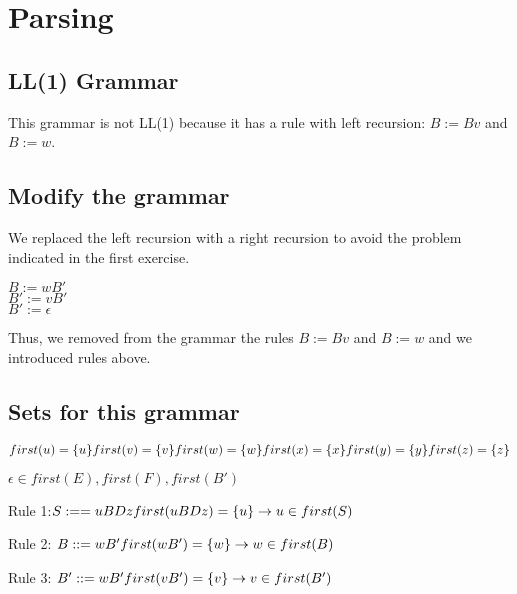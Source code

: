 \label{parsing}
\section{Parsing}
\subsection{LL(1) Grammar}
 This grammar is not LL(1) because it has a rule with left recursion: $B:=Bv$ and $B:=w$.\\
\subsection{Modify the grammar}
We replaced the left recursion with a right recursion to avoid the problem indicated in the first exercise.
\begin{center}            
	$B:=wB'$\\
        $B':=vB'$\\
        $B':=\epsilon$\\
\end{center}
Thus, we removed from the grammar the rules $B:=Bv$ and $B:=w$ and we introduced rules above.\\
\subsection{Sets for this grammar}

			$first(u) = \{u\}\\
            first(v) = \{v\}\\
            first(w) = \{w\}\\
            first(x) = \{x\}\\
            first(y) = \{y\}\\
            first(z) = \{z\}$
                
            $\epsilon \in first(E), first(F), first(B')$

            Rule 1:$ S:== uBDz\\
            first(uBDz) = \{u\}\\
            \rightarrow u \in first(S)$
            
            Rule 2: $B::=wB'\\
            first(wB')=\{w\}\\
            \rightarrow w\in first(B)$
            
            Rule 3: $B'::= wB'\\
            first(vB') = \{v\}\\
            \rightarrow v \in first(B')$
            

